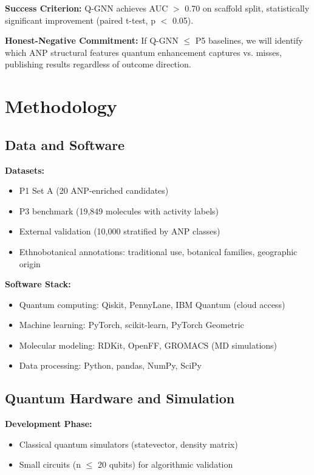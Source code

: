 \documentclass[11pt,a4paper]{article}
\begin{document}
\textbf{Success Criterion:} Q-GNN achieves AUC $>$ 0.70 on scaffold split, statistically significant improvement (paired t-test, p $<$ 0.05).

\textbf{Honest-Negative Commitment:} If Q-GNN $\leq$ P5 baselines, we will identify which ANP structural features quantum enhancement captures vs. misses, publishing results regardless of outcome direction.

\section{Methodology}

\subsection{Data and Software}

\textbf{Datasets:}
\begin{itemize}
    \item P1 Set A (20 ANP-enriched candidates)
    \item P3 benchmark (19,849 molecules with activity labels)
    \item External validation (10,000 stratified by ANP classes)
    \item Ethnobotanical annotations: traditional use, botanical families, geographic origin
\end{itemize}

\textbf{Software Stack:}
\begin{itemize}
    \item Quantum computing: Qiskit, PennyLane, IBM Quantum (cloud access)
    \item Machine learning: PyTorch, scikit-learn, PyTorch Geometric
    \item Molecular modeling: RDKit, OpenFF, GROMACS (MD simulations)
    \item Data processing: Python, pandas, NumPy, SciPy
\end{itemize}

\subsection{Quantum Hardware and Simulation}

\textbf{Development Phase:}
\begin{itemize}
    \item Classical quantum simulators (statevector, density matrix)
    \item Small circuits (n $\leq$ 20 qubits) for algorithmic validation
\end{itemize}
\end{document}
